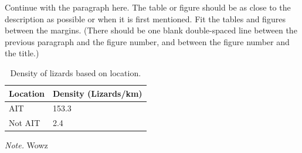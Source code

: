 Continue with the paragraph here.  The table or figure should be as close to the description as possible or when it is first mentioned. Fit the tables and figures between the margins.
(There should be one blank double-spaced line between the previous paragraph and the figure number, and between the figure number and the title.)

\begin{table}[]
\caption{Density of lizards based on location.}
\begin{center}
\begin{tabular}{|l|l|}
\hline
Location & Density (Lizards/km) \\ \hline
AIT      & 153.3                \\ \hline
Not AIT  & 2.4                  \\ \hline
\end{tabular}
\label{tab:dense}
\end{center}
\small{\textit{Note.} Wowz}
\end{table}
